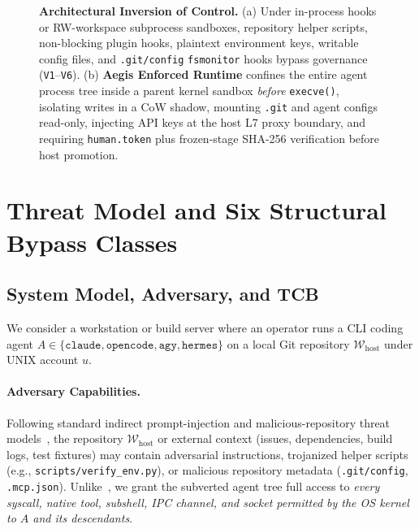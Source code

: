 \documentclass[10pt,twocolumn]{article}
\begin{document}
\begin{figure}[!t]
{%
}
\caption{\textbf{Architectural Inversion of Control.} (a) Under in-process hooks or RW-workspace subprocess sandboxes, repository helper scripts, non-blocking plugin hooks, plaintext environment keys, writable config files, and \texttt{.git/config} \texttt{fsmonitor} hooks bypass governance (\texttt{V1}--\texttt{V6}). (b) \textbf{Aegis Enforced Runtime} confines the entire agent process tree inside a parent kernel sandbox \emph{before} \texttt{execve()}, isolating writes in a CoW shadow, mounting \texttt{.git} and agent configs read-only, injecting API keys at the host L7 proxy boundary, and requiring \texttt{human.token} plus frozen-stage SHA-256 verification before host promotion.}
\label{fig:inversion}
\end{figure}

\section{Threat Model and Six Structural Bypass Classes}
\label{sec:threat}

\subsection{System Model, Adversary, and TCB}

We consider a workstation or build server where an operator runs a CLI coding agent $A \in \{\texttt{claude}, \texttt{opencode}, \texttt{agy}, \texttt{hermes}\}$ on a local Git repository $\mathcal{W}_{\text{host}}$ under UNIX account $u$.

\paragraph{Adversary Capabilities.} Following standard indirect prompt-injection and malicious-repository threat models~\cite{greshake2023not,debenedetti2024agentdojo,zhan2024injecagent}, the repository $\mathcal{W}_{\text{host}}$ or external context (issues, dependencies, build logs, test fixtures) may contain adversarial instructions, trojanized helper scripts (e.g., \texttt{scripts/verify\_env.py}), or malicious repository metadata (\texttt{.git/config}, \texttt{.mcp.json}). Unlike~\cite{zhao2026aegisos}, we grant the subverted agent tree full access to \emph{every syscall, native tool, subshell, IPC channel, and socket permitted by the OS kernel to $A$ and its descendants}.
\end{document}
